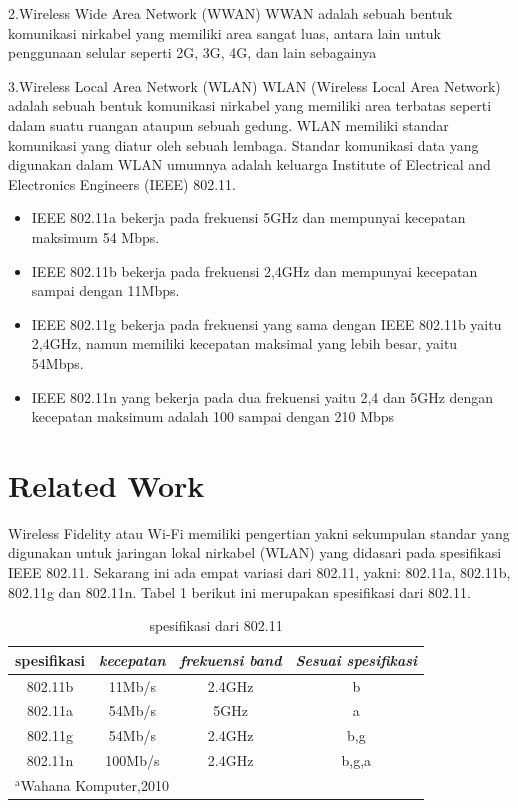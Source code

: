 \documentclass[conference]{IEEEtran}
\begin{document}
2.Wireless Wide Area Network (WWAN)
WWAN adalah sebuah bentuk komunikasi nirkabel yang memiliki area sangat luas, antara lain untuk penggunaan selular seperti 2G, 3G, 4G, dan lain sebagainya
\vspace{5pt}

3.Wireless Local Area Network (WLAN)
WLAN (Wireless Local Area Network) adalah sebuah bentuk komunikasi nirkabel yang memiliki area terbatas seperti dalam suatu ruangan ataupun sebuah gedung. WLAN memiliki standar komunikasi yang diatur oleh sebuah lembaga. Standar komunikasi data yang digunakan dalam WLAN umumnya adalah keluarga Institute of Electrical and Electronics Engineers (IEEE) 802.11.
\begin{itemize}
    \item  IEEE 802.11a bekerja pada frekuensi 5GHz dan mempunyai kecepatan maksimum 54 Mbps.
    \item IEEE 802.11b bekerja pada frekuensi 2,4GHz dan mempunyai kecepatan sampai dengan 11Mbps.
    \item IEEE 802.11g bekerja pada frekuensi yang sama dengan IEEE 802.11b yaitu 2,4GHz, namun memiliki kecepatan maksimal yang lebih besar, yaitu 54Mbps.
    \item   IEEE 802.11n yang bekerja pada dua frekuensi yaitu 2,4 dan 5GHz dengan kecepatan maksimum adalah 100 sampai dengan 210 Mbps
\end{itemize}
\vspace{0.1pt}

\section{Related Work}
\vspace{0.1pt}

Wireless Fidelity atau Wi-Fi memiliki pengertian yakni sekumpulan standar yang digunakan untuk jaringan lokal nirkabel (WLAN) yang didasari pada spesifikasi IEEE 802.11. Sekarang ini ada empat variasi dari 802.11, yakni: 802.11a, 802.11b, 802.11g dan 802.11n. Tabel 1 berikut ini merupakan spesifikasi dari 802.11.
\begin{table}[htbp]
    \caption{spesifikasi dari 802.11}
    \begin{center}
    \begin{tabular}{|c|c|c|c|}
        \hline
    \textbf{spesifikasi} & \textbf{\textit{kecepatan}}& \textbf{\textit{frekuensi band}}& \textbf{\textit{Sesuai spesifikasi}} \\
    \hline
    802.11b & 11Mb/s & 2.4GHz & b  \\
    \hline
    802.11a & 54Mb/s & 5GHz & a  \\
    \hline
    802.11g & 54Mb/s & 2.4GHz & b,g  \\
    \hline
    802.11n & 100Mb/s & 2.4GHz & b,g,a  \\
    \hline
    \multicolumn{4}{l}{$^{\mathrm{a}}$Wahana Komputer,2010}
    \end{tabular}
    \label{tab1}
    \end{center}
    \end{table}
    
\end{document}
